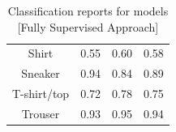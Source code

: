 \begin{table}[H]
\begin{minipage}{0.32\textwidth}
\begin{adjustbox}{max width=1\textwidth}
\begin{tabular}{|c|c|c|c|}
                Shirt              & 0.55               & 0.60            & 0.58              \\
                Sneaker            & 0.94               & 0.84            & 0.89              \\
                T-shirt/top        & 0.72               & 0.78            & 0.75              \\
                Trouser            & 0.93               & 0.95            & 0.94              \\ \hline
            \end{tabular}
        \end{adjustbox}
    \end{minipage}
    \caption{\footnotesize Classification reports for models [Fully Supervised Approach]}
    \label{tab:ClassificationReport_FullySupervised}
\end{table}

